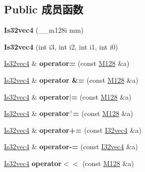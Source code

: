 \subsection*{Public 成员函数}
\begin{DoxyCompactItemize}
\item 
\mbox{\label{class_is32vec4_aaedba33aa8c2365d207b52315407cd96}} 
{\bfseries Is32vec4} (\+\_\+\+\_\+m128i mm)
\item 
\mbox{\label{class_is32vec4_af1c1874ff15b64e78433e09ae9b69080}} 
{\bfseries Is32vec4} (int i3, int i2, int i1, int i0)
\item 
\mbox{\label{class_is32vec4_a611209194c1bb4a9752d0a03a242e261}} 
\hyperlink{class_is32vec4}{Is32vec4} \& {\bfseries operator=} (const \hyperlink{class_m128}{M128} \&a)
\item 
\mbox{\label{class_is32vec4_a9cc3bc171ab7b8e9ffedbe966e930b5f}} 
\hyperlink{class_is32vec4}{Is32vec4} \& {\bfseries operator \&=} (const \hyperlink{class_m128}{M128} \&a)
\item 
\mbox{\label{class_is32vec4_a9d89bfadcea7e67173a16f69103da9ea}} 
\hyperlink{class_is32vec4}{Is32vec4} \& {\bfseries operator$\vert$=} (const \hyperlink{class_m128}{M128} \&a)
\item 
\mbox{\label{class_is32vec4_ab8f9f24919458d75e23a820ee88ecc24}} 
\hyperlink{class_is32vec4}{Is32vec4} \& {\bfseries operator$^\wedge$=} (const \hyperlink{class_m128}{M128} \&a)
\item 
\mbox{\label{class_is32vec4_a73afe4c6026a1049b7c1c3405f708211}} 
\hyperlink{class_is32vec4}{Is32vec4} \& {\bfseries operator+=} (const \hyperlink{class_i32vec4}{I32vec4} \&a)
\item 
\mbox{\label{class_is32vec4_ab7955537cf29461658b80e56a5003918}} 
\hyperlink{class_is32vec4}{Is32vec4} \& {\bfseries operator-\/=} (const \hyperlink{class_i32vec4}{I32vec4} \&a)
\item 
\mbox{\label{class_is32vec4_a5f30623b7821e329fade85e7e94549cc}} 
\hyperlink{class_is32vec4}{Is32vec4} {\bfseries operator$<$$<$} (const \hyperlink{class_m128}{M128} \&a)

\end{DoxyCompactItemize}
